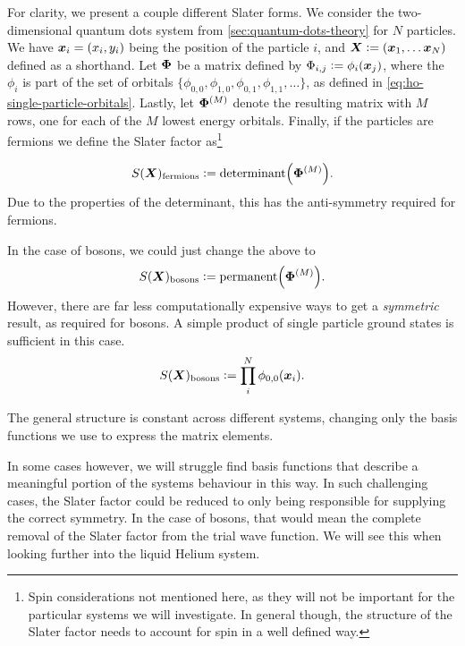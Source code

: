 \documentclass[Thesis.tex]{subfiles}
\begin{document}
For clarity, we present a couple different Slater forms. We consider the two-dimensional
quantum dots system from \autoref{sec:quantum-dots-theory} for $N$ particles.  We have
$\bm{x}_i=(x_i, y_i)$ being the position of the particle $i$, and $\vb X\defeq (\vb x_1,
\dots \vb x_N)$ defined as a shorthand. Let $\bm{\Phi}$ be a matrix defined by $\Phi_{i,j}
\vcentcolon= \phi_{i}(\bm{x}_j)$, where the $\phi_i$ is part of the set of orbitals
$\{\phi_{0,0}, \phi_{1,0},\phi_{0,1}, \phi_{1,1},\dots\}$, as defined in
\autoref{eq:ho-single-particle-orbitals}. Lastly, let $\bm{\Phi}^{(M)}$ denote the
resulting matrix with $M$ rows, one for each of the $M$ lowest energy orbitals. Finally,
if the particles are fermions we define the Slater factor as\footnote{Spin considerations not mentioned here, as they will not be important for the particular systems we will investigate. In general though, the structure of the Slater factor needs to account for spin in a well defined way.}

\begin{align}
    S(\bm{X})_\text{fermions} \vcentcolon= \text{determinant}\qty(\bm{\Phi}^{(M)}).
\end{align}
Due to the properties of the determinant, this has the anti-symmetry required for
fermions.

In the case of bosons, we could just change the above to
\begin{align}
    S(\bm{X})_\text{bosons} \vcentcolon= \text{permanent}\qty(\bm{\Phi}^{(M)}).
\end{align}
However, there are far less computationally expensive ways to get a \emph{symmetric}
result, as required for bosons. A simple product of single particle ground states is
sufficient in this case.
\begin{align}
    S(\bm{X})_\text{bosons} \vcentcolon= \prod_{i}^N \phi_{0,0}(\bm{x}_i).
\end{align}

The general structure is constant across different systems, changing only the basis
functions we use to express the matrix elements.

In some cases however, we will struggle find basis functions that describe a meaningful
portion of the systems behaviour in this way. In such challenging cases, the Slater factor
could be reduced to only being responsible for supplying the correct symmetry. In the case
of bosons, that would mean the complete removal of the Slater factor from the trial wave
function. We will see this when looking further into the liquid Helium system.
\end{document}

